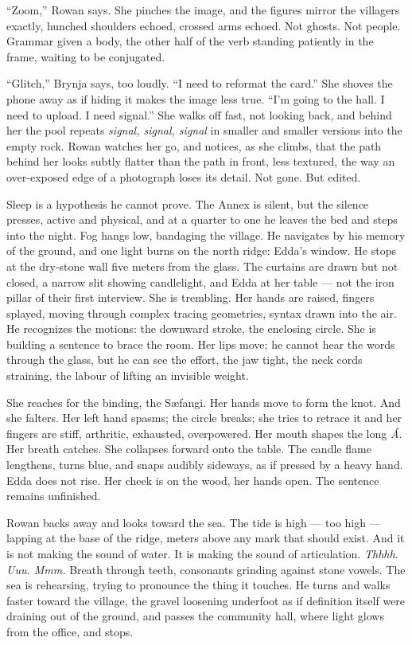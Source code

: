 \documentclass[11pt,oneside]{book}
\newcommand{\sceneline}{%
  \par\vspace{1.2em}
  \begin{center}
    \fontsize{11}{11}\selectfont \textbullet\quad\textbullet\quad\textbullet
  \end{center}
  \vspace{0.6em}\noindent\ignorespaces
}
\begin{document}
``Zoom,'' Rowan says. She pinches the image, and the figures mirror the
villagers exactly, hunched shoulders echoed, crossed arms echoed. Not
ghosts. Not people. Grammar given a body, the other half of the verb
standing patiently in the frame, waiting to be conjugated.

``Glitch,'' Brynja says, too loudly. ``I need to reformat the card.''
She shoves the phone away as if hiding it makes the image less true.
``I'm going to the hall. I need to upload. I need signal.'' She walks
off fast, not looking back, and behind her the pool repeats
\emph{signal, signal, signal} in smaller and smaller versions into the
empty rock. Rowan watches her go, and notices, as she climbs, that the
path behind her looks subtly flatter than the path in front, less
textured, the way an over-exposed edge of a photograph loses its detail.
Not gone. But edited.

\sceneline

Sleep is a hypothesis he cannot prove. The Annex is silent, but the
silence presses, active and physical, and at a quarter to one he leaves
the bed and steps into the night. Fog hangs low, bandaging the village.
He navigates by his memory of the ground, and one light burns on the
north ridge: Edda's window. He stops at the dry-stone wall five meters
from the glass. The curtains are drawn but not closed, a narrow slit
showing candlelight, and Edda at her table --- not the iron pillar of
their first interview. She is trembling. Her hands are raised, fingers
splayed, moving through complex tracing geometries, syntax drawn into
the air. He recognizes the motions: the downward stroke, the enclosing
circle. She is building a sentence to brace the room. Her lips move; he
cannot hear the words through the glass, but he can see the effort, the
jaw tight, the neck cords straining, the labour of lifting an invisible
weight.

She reaches for the binding, the Sæfangi. Her hands move to form the
knot. And she falters. Her left hand spasms; the circle breaks; she
tries to retrace it and her fingers are stiff, arthritic, exhausted,
overpowered. Her mouth shapes the long \emph{Á.} Her breath catches. She
collapses forward onto the table. The candle flame lengthens, turns
blue, and snaps audibly sideways, as if pressed by a heavy hand. Edda
does not rise. Her cheek is on the wood, her hands open. The sentence
remains unfinished.

Rowan backs away and looks toward the sea. The tide is high --- too high
--- lapping at the base of the ridge, meters above any mark that should
exist. And it is not making the sound of water. It is making the sound
of articulation. \emph{Thhhh. Uuu. Mmm.} Breath through teeth,
consonants grinding against stone vowels. The sea is rehearsing, trying
to pronounce the thing it touches. He turns and walks faster toward the
village, the gravel loosening underfoot as if definition itself were
draining out of the ground, and passes the community hall, where light
glows from the office, and stops.
\end{document}
